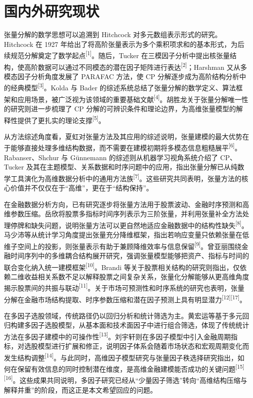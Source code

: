\section{国内外研究现状}

张量分解的数学思想可以追溯到 Hitchcock 对多元数组表示形式的研究。Hitchcock 在 1927 年给出了将高阶张量表示为多个乘积项求和的基本形式，为后续规范分解奠定了数学起点\textsuperscript{[1]}。随后，Tucker 在三模因子分析中提出核张量结构，使高阶数据可以通过不同模态的潜在因子矩阵进行表达\textsuperscript{[2]}；Harshman 又从多模态因子分析角度发展了 PARAFAC 方法，使 CP 分解逐步成为高阶结构分析中的经典模型\textsuperscript{[3]}。Kolda 与 Bader 的综述系统总结了张量分解的数学定义、算法框架和应用场景，被广泛视为该领域的重要基础文献\textsuperscript{[4]}。胡胜龙关于张量分解唯一性的研究则进一步梳理了 CP 分解的可辨识条件和理论边界，为高维张量模型的解释性提供了更扎实的理论支撑\textsuperscript{[5]}。

从方法综述角度看，夏虹对张量方法及其应用的综述说明，张量建模的最大优势在于能够直接处理多维结构数据，而不需要在建模初期将多模态信息粗糙展平\textsuperscript{[6]}。Rabanser、Shchur 与 Günnemann 的综述则从机器学习视角系统介绍了 CP、Tucker 及其在主题模型、关系数据和时序问题中的应用，指出张量分解已从纯数学工具演化为高维数据分析中的通用方法族\textsuperscript{[7]}。这些研究共同表明，张量方法的核心价值并不仅仅在于“高维”，更在于“结构保持”。

在金融数据分析方向，已有研究逐步将张量方法用于股票波动、金融时序预测和高维参数压缩。岳欣将股票多指标时间序列表示为三阶张量，并利用张量补全方法处理停牌和缺失问题，说明张量方法可以更自然地适应金融数据中的结构性缺失\textsuperscript{[8]}。马少沛等从统计学习角度提出张量充分降维框架，指出若响应变量只依赖张量在低维子空间上的投影，则张量表示有助于兼顾降维效率与信息保留\textsuperscript{[9]}。曾亚丽围绕金融时间序列中的多维耦合结构展开研究，强调张量模型能够把资产、指标与时间的联合变化纳入统一建模框架\textsuperscript{[10]}。Brandi 等关于股票相关结构的研究则指出，仅依赖二维收益相关系数不足以解释股票之间复杂关系，张量化分解能够从更高维角度揭示股票间的共振与联动\textsuperscript{[11]}。关于市场可预测性和时序系统的研究也表明，张量分解在金融市场结构提取、时序参数压缩和潜在因子预测上具有明显潜力\textsuperscript{[12][17]}。

在多因子选股领域，传统路径仍以回归分析和统计筛选为主。黄宏运等基于多元回归构建多因子选股模型，从基本面和技术面因子中进行组合筛选，体现了传统统计方法在多因子建模中的可操作性\textsuperscript{[13]}。刘宇轩则在多因子模型中引入金融周期指标，对选股模型进行扩展和修正，说明因子体系会随着市场状态和宏观周期变化而发生结构调整\textsuperscript{[14]}。与此同时，高维因子模型研究与张量因子秩选择研究指出，如何在保留有效信息的同时控制潜在维度，是高维金融建模能否成功的关键问题\textsuperscript{[15][16]}。这些成果共同说明，多因子研究已经从“少量因子筛选”转向“高维结构压缩与解释并重”的阶段，而这正是本文希望回应的问题。

